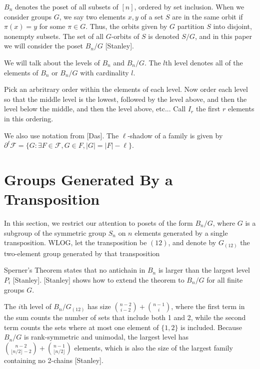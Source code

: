 \documentclass[12pt]{article}
\theoremstyle{plain}
\theoremstyle{definition}
\theoremstyle{remark}
\newcommand{\F}{\mathcal{F}}
\begin{document}

$B_n$ denotes the poset of all subsets of $[n]$, ordered by set inclusion. When we consider groups $G$, we say two elements $x, y$ of a set $S$ are in the same orbit if $\pi(x) = y$ for some $\pi \in G$. Thus, the orbits given by $G$ partition $S$ into disjoint, nonempty subsets. The set of all $G$-orbits of $S$ is denoted $S / G$, and in this paper we will consider the poset $B_n / G$ [Stanley]. 

We will talk about the levels of $B_n$ and $B_n/G$. The $l$th level denotes all of the elements of $B_n$ or $B_n/G$ with cardinality $l$. 

Pick an arbritrary order within the elements of each level. Now order each level so that the middle level is the lowest, followed by the level above, and then the level below the middle, and then the level above, etc... Call $I_r$ the first $r$ elements in this ordering. 


We also use notation from [Das]. The $\ell$-shadow of a family is given by $\partial^{\ell}\F = \{G: \exists F \in \F, G \in F, |G| = |F| - \ell\}$.


\section{Groups Generated By a Transposition}

In this section, we restrict our attention to posets of the form $B_n / G$, where $G$ is a subgroup of the symmetric group $S_n$ on $n$ elements generated by a single transposition. WLOG, let the transposition be $(12)$, and denote by $G_{(12)}$ the two-element group generated by that transposition

Sperner's Theorem states that no antichain in $B_n$ is larger than the largest level $P_i$ [Stanley]. [Stanley] shows how to extend the theorem to $B_n / G$ for all finite groups $G$. 

The $i$th level of $B_n / G_{(12)}$ has size $\binom{n-2}{i-2} + \binom{n-1}{i}$, where the first term in the sum counts the number of sets that include both 1 and 2, while the second term counts the sets where at most one element of $\{1,2\}$ is included. Because $B_n / G$ is rank-symmetric and unimodal, the largest level has $\binom{n-2}{\lfloor n/2 \rfloor -2} + \binom{n-1}{\lfloor n/2 \rfloor}$ elements, which is also the size of the largest family containing no 2-chains [Stanley].
\end{document}
